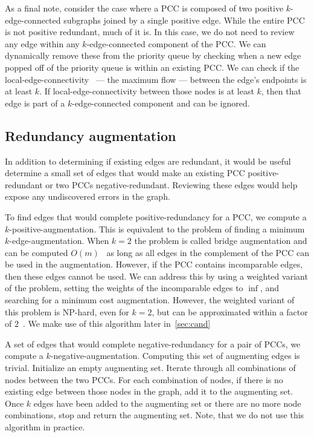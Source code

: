 As a final note, consider the case where a PCC is composed of two positive $k$-edge-connected subgraphs joined by
  a single positive edge.
While the entire PCC is not positive redundant, much of it is.
In this case, we do not need to review any edge within any $k$-edge-connected component of the PCC.
We can dynamically remove these from the priority queue by checking when a new edge popped off of the priority
  queue is within an existing PCC.
We can check if the local-edge-connectivity~\cite{esfahanian_connectivity_2017} --- \ie{} the maximum flow ---
  between the edge's endpoints is at least $k$.
If local-edge-connectivity between those nodes is at least $k$, then that edge is part of a $k$-edge-connected
  component and can be ignored.


\subsection{Redundancy augmentation}\label{subsec:augredun}

In addition to determining if existing edges are redundant, it would be useful determine a small set of edges
  that would make an existing PCC positive-redundant or two PCCs negative-redundant.
Reviewing these edges would help expose any undiscovered errors in the graph.

To find edges that would complete positive-redundancy for a PCC, we compute a $k$-positive-augmentation.
This is equivalent to the problem of finding a minimum $k$-edge-augmentation.
When $k=2$ the problem is called bridge augmentation and can be computed $O(m)$~\cite{eswaran_augmentation_1976}
  as long as all edges in the complement of the PCC can be used in the augmentation.
However, if the PCC contains incomparable edges, then these edges cannot be used.
We can address this by using a weighted variant of the problem, setting the weights of the incomparable edges to
  $\inf$, and searching for a minimum cost augmentation.
However, the weighted variant of this problem is NP-hard, even for $k=2$, but can be approximated within a factor
  of $2$~\cite{khuller_approximation_1993}.
We make use of this algorithm later in~\cref{sec:cand}

A set of edges that would complete negative-redundancy for a pair of PCCs, we compute a
  $k$-negative-augmentation.
Computing this set of augmenting edges is trivial.
Initialize an empty augmenting set.
Iterate through all combinations of nodes between the two PCCs.
For each combination of nodes, if there is no existing edge between those nodes in the graph, add it to the
  augmenting set.
Once $k$ edges have been added to the augmenting set or there are no more node combinations, stop and return the
  augmenting set.
Note, that we do not use this algorithm in practice.

